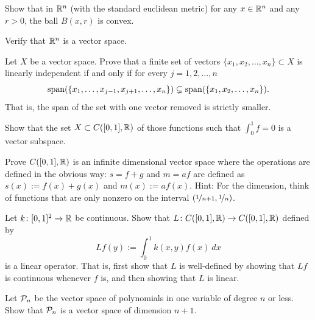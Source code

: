 \begin{exercise}
Show that in ${\mathbb{R}}^n$
(with the standard euclidean metric)
for any $x \in {\mathbb{R}}^n$ and any $r > 0$,
the ball $B(x,r)$ is
convex.
\end{exercise}


\begin{exercise}
Verify that ${\mathbb{R}}^n$ is a vector space.
\end{exercise}

\begin{exercise}
Let $X$ be a vector space.
Prove that a finite set of vectors $\{ x_1,x_2,\ldots,x_n \} \subset X$ 
is linearly independent if and only if for every $j=1,2,\ldots,n$
\begin{equation*}
\operatorname{span}( \{ x_1,\ldots,x_{j-1},x_{j+1},\ldots,x_n \}) \subsetneq
\operatorname{span}( \{ x_1,x_2,\ldots,x_n \}) .
\end{equation*}
That is, the span of the set with one vector removed is strictly smaller.
\end{exercise}

\begin{exercise}
Show that the set $X \subset C([0,1],{\mathbb{R}})$ of those functions such 
that $\int_0^1 f = 0$ is a vector subspace.
\end{exercise}

\begin{exercise}[Challenging]
Prove $C([0,1],{\mathbb{R}})$ is an infinite dimensional vector space
where the operations are defined in the obvious way:
$s=f+g$ and $m=af$ are defined as
$s(x) := f(x)+g(x)$ and
$m(x) := a f(x)$.
Hint: For the dimension, think of functions that are only nonzero
on the interval $(\nicefrac{1}{n+1},\nicefrac{1}{n})$.
\end{exercise}

\begin{exercise} \label{exercise:continuouskernel}
Let $k \colon [0,1]^2 \to {\mathbb{R}}$ be continuous.  Show that
$L \colon C([0,1],{\mathbb{R}}) \to C([0,1],{\mathbb{R}})$ defined by
\begin{equation*}
Lf(y) := \int_0^1 k(x,y)f(x)~dx
\end{equation*}
is a linear operator.  That is, first show that $L$ is well-defined by
showing that $Lf$ is continuous whenever $f$ is, and
then showing that $L$ is linear.
\end{exercise}

\begin{exercise}
Let ${\mathcal{P}}_n$ be the vector space of polynomials in one variable of degree $n$
or less.  Show that ${\mathcal{P}}_n$ is a vector space of dimension $n+1$.
\end{exercise}

